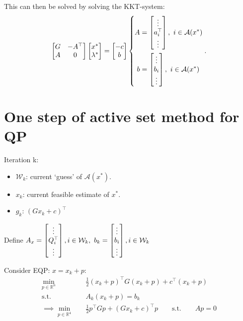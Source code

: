 \documentclass{article}
\begin{document}
This can then be solved by solving the KKT-system:
\[
  \begin{bmatrix} G & -A^{\top} \\ A & 0 \end{bmatrix}\begin{bmatrix} x^* \\ \lambda^* \end{bmatrix} = \begin{bmatrix} -c \\ b \end{bmatrix} \left\{
  \begin{aligned}
    A & = \begin{bmatrix} \vdots \\ a_i^{\top} \\ \vdots \end{bmatrix} ,\ i\in \mathcal{A}(x^*)  \\
    b & = \begin{bmatrix} \vdots \\ b_i \\ \vdots \end{bmatrix} ,\ i\in \mathcal{A}(x^*)
  \end{aligned}
  \right.
  .\]

\section{One step of active set method for QP}

Iteration k:
\begin{itemize}
  \item $\mathcal{W}_k$: current `guess' of $\mathcal{A}(x^*)$.
  \item $x_k$: current feasible estimate of $x^*$.
  \item $g_k$: $(Gx_k + c)^{\top}$
\end{itemize}

Define $A_x = \begin{bmatrix} \vdots \\ Q_i^{\top} \\ \vdots \end{bmatrix}, i\in \mathcal{W}_k,\  b_k = \begin{bmatrix} \vdots \\ b_i \\ \vdots \end{bmatrix}, i\in \mathcal{W}_k$

\medskip Consider EQP: $x = x_k + p$:
\begin{align*}
  \min_{p\in \mathbb{R}^{n}}\quad           & \frac{1}{2}(x_k+ p) ^{\top}G(x_k + p) + c^{\top}(x_k+ p)                  \\
  \text{s.t.}\quad                          & A_k(x_k + p) = b_k                                                        \\
  \implies \min_{p\in \mathbb{R}^{4}} \quad & \frac{1}{2}p^{\top}Gp + (Gx_k + c)^{\top}p \qquad\text{s.t.}\qquad Ap = 0
\end{align*}
\end{document}
